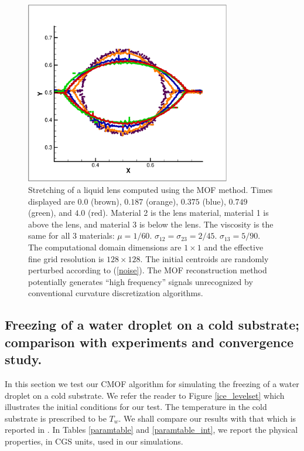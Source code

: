 \documentclass[]{article}
\begin{document}
\begin{figure}[htbp]
\centering
\includegraphics[width=0.8\textwidth]{MOFNOISE.eps} 
\caption{Stretching of a liquid lens computed using the MOF method.  
	Times displayed are $0.0$ (brown), $0.187$ (orange), 
	$0.375$ (blue), $0.749$ (green), and $4.0$ (red).
	Material 2 is the
	lens material, material 1 is above the lens, and
	material 3 is below the lens.  
	The viscosity is the
	same for all 3 materials: $\mu=1/60$.  
	$\sigma_{12}=\sigma_{23}=2/45$.   $\sigma_{13}=5/90$.
        The computational domain dimensions are $1\times 1$ and
	the effective fine grid resolution is $128\times 128$.
	The initial centroids are randomly perturbed according
        to (\ref{noise}).  The MOF reconstruction method potentially
        generates ``high frequency'' signals unrecognized by
        conventional curvature discretization algorithms.
        }
 \label{MOF_liquid_lens}
\end{figure}


\subsection{Freezing of a water droplet on a cold substrate; comparison with
  experiments and convergence study. \label{freezing_sec} }

In this section we test our CMOF algorithm for simulating the freezing
of a water droplet on a cold substrate.  We refer the reader to 
Figure \ref{ice_levelset} which illustrates the initial conditions for
our test.  The temperature in the cold substrate is prescribed to be
$T_{w}$.  We shall compare our results with
that which is reported in \cite{hu2010icing}.  
In Tables \ref{paramtable} and \ref{paramtable_int},
we report the physical properties, in CGS units,
used in our simulations.
\end{document}
